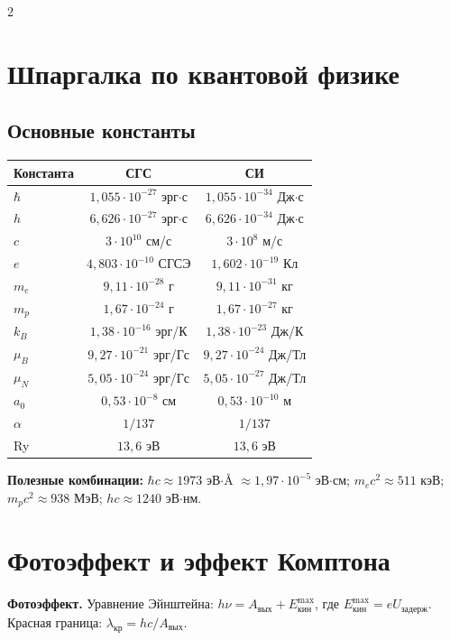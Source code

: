 \documentclass[10pt,a4paper]{article}
\begin{document}
\begin{multicols}{2}

\section*{Шпаргалка по квантовой физике}

\subsection*{Основные константы}
\begin{tabular}{lcc}
\toprule
Константа & СГС & СИ \\
\midrule
$\hbar$ & $1{,}055\cdot10^{-27}$ эрг$\cdot$с & $1{,}055\cdot10^{-34}$ Дж$\cdot$с \\
$h$ & $6{,}626\cdot10^{-27}$ эрг$\cdot$с & $6{,}626\cdot10^{-34}$ Дж$\cdot$с \\
$c$ & $3\cdot10^{10}$ см/с & $3\cdot10^{8}$ м/с \\
$e$ & $4{,}803\cdot10^{-10}$ СГСЭ & $1{,}602\cdot10^{-19}$ Кл \\
$m_e$ & $9{,}11\cdot10^{-28}$ г & $9{,}11\cdot10^{-31}$ кг \\
$m_p$ & $1{,}67\cdot10^{-24}$ г & $1{,}67\cdot10^{-27}$ кг \\
$k_B$ & $1{,}38\cdot10^{-16}$ эрг/К & $1{,}38\cdot10^{-23}$ Дж/К \\
$\mu_B$ & $9{,}27\cdot10^{-21}$ эрг/Гс & $9{,}27\cdot10^{-24}$ Дж/Тл \\
$\mu_N$ & $5{,}05\cdot10^{-24}$ эрг/Гс & $5{,}05\cdot10^{-27}$ Дж/Тл \\
$a_0$ & $0{,}53\cdot10^{-8}$ см & $0{,}53\cdot10^{-10}$ м \\
$\alpha$ & $1/137$ & $1/137$ \\
Ry & $13{,}6$ эВ & $13{,}6$ эВ \\
\bottomrule
\end{tabular}

\textbf{Полезные комбинации:}
$\hbar c \approx 1973$ эВ$\cdot$Å $\approx 1{,}97\cdot10^{-5}$ эВ$\cdot$см;
$m_e c^2 \approx 511$ кэВ;
$m_p c^2 \approx 938$ МэВ;
$hc \approx 1240$ эВ$\cdot$нм.

\section{Фотоэффект и эффект Комптона}

\textbf{Фотоэффект.} Уравнение Эйнштейна:
$h\nu = A_{\text{вых}} + E_{\text{кин}}^{\max}$,
где $E_{\text{кин}}^{\max} = eU_{\text{задерж}}$.
Красная граница: $\lambda_{\text{кр}} = hc/A_{\text{вых}}$.


\end{multicols}
\end{document}
